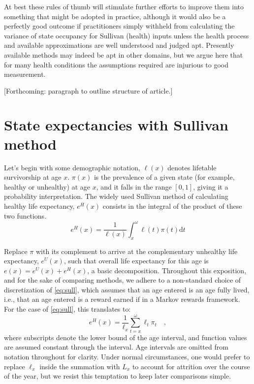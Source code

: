 \documentclass{bmcart}
\begin{document}
At best these rules of thumb will stimulate further efforts to improve them into something that might be adopted in practice, although it would also be a perfectly good outcome if practitioners simply withheld from calculating the variance of state occupancy for Sullivan (health) inputs unless the health process and available approximations are well understood and judged apt. Presently available methods may indeed be apt in other domains, but we argue here that for many health conditions the assumptions required are injurious to good measurement.

[Forthcoming: paragraph to outline structure of article.]

\section{State expectancies with Sullivan method}
Let's begin with some demographic notation, $\ell(x)$ denotes lifetable survivorship at age $x$. $\pi(x)$ is the prevalence of a given state (for example, healthy or unhealthy) at age $x$, and it falls in the range $[0,1]$, giving it a probability interpretation. The widely used Sullivan method \citep{sullivan1971single} of calculating healthy life expectancy, $e^H(x)$ consists in the integral of the product of these two functions.
%
\begin{equation}
\label{eq:sull}
e^H(x) = \frac{1}{\ell(x)} \int_x^\omega \ell(t)\pi(t) \mathrm{d}t
\end{equation}
%

Replace $\pi$ with its complement to arrive at the complementary unhealthy life expectancy, $e^U(x)$, such that overall life expectancy for this age is $e(x) = e^U(x) + e^H(x)$, a basic decomposition. Throughout this exposition, and for the sake of comparing methods, we adhere to a non-standard choice of discretization of \ref{eq:sull}, which assumes that an age entered is an age fully lived, i.e., that an age entered is a reward earned if in a Markov rewards framework. For the case of \eqref{eq:sull}, this translates to:
\begin{equation}
\label{eq:sulldisc}
e^H(x) = \frac{1}{\ell_x} \sum_{t=x}^\omega \ell_t\pi_t \quad \mathrm{,}
\end{equation}
where subscripts denote the lower bound of the age interval, and function values are assumed constant through the interval. Age intervals are omitted from notation throughout for clarity. Under normal circumstances, one would prefer to replace $\ell_x$ inside the summation with $L_x$ to account for attrition over the course of the year, but we resist this temptation to keep later comparisons simple.
\end{document}
